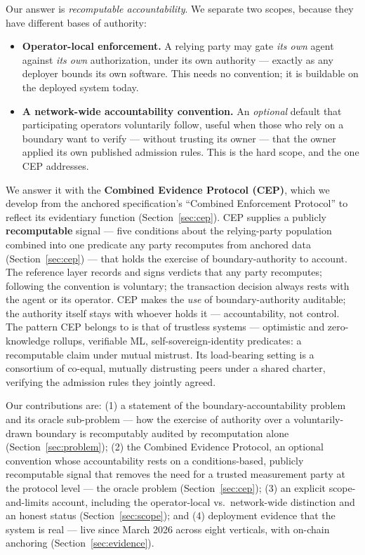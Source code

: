 Our answer is \emph{recomputable accountability}. We separate two scopes, because they have different bases of authority:

\begin{itemize}
  \item \textbf{Operator-local enforcement.} A relying party may gate \emph{its own} agent against \emph{its own} authorization, under its own authority — exactly as any deployer bounds its own software. This needs no convention; it is buildable on the deployed system today.
  \item \textbf{A network-wide accountability convention.} An \emph{optional} default that participating operators voluntarily follow, useful when those who rely on a boundary want to verify — without trusting its owner — that the owner applied its own published admission rules. This is the hard scope, and the one CEP addresses.
\end{itemize}

We answer it with the \textbf{Combined Evidence Protocol (CEP)}, which we develop from the anchored specification's ``Combined Enforcement Protocol'' to reflect its evidentiary function (Section~\ref{sec:cep}). CEP supplies a publicly \textbf{recomputable} signal — five conditions about the relying-party population combined into one predicate any party recomputes from anchored data (Section~\ref{sec:cep}) — that holds the exercise of boundary-authority to account. The reference layer records and signs verdicts that any party recomputes; following the convention is voluntary; the transaction decision always rests with the agent or its operator. CEP makes the \emph{use} of boundary-authority auditable; the authority itself stays with whoever holds it — accountability, not control. The pattern CEP belongs to is that of trustless systems — optimistic and zero-knowledge rollups, verifiable ML, self-sovereign-identity predicates: a recomputable claim under mutual mistrust. Its load-bearing setting is a consortium of co-equal, mutually distrusting peers under a shared charter, verifying the admission rules they jointly agreed.

Our contributions are: (1) a statement of the boundary-accountability problem and its oracle sub-problem — how the exercise of authority over a voluntarily-drawn boundary is recomputably audited by recomputation alone (Section~\ref{sec:problem}); (2) the Combined Evidence Protocol, an optional convention whose accountability rests on a conditions-based, publicly recomputable signal that removes the need for a trusted measurement party at the protocol level — the oracle problem (Section~\ref{sec:cep}); (3) an explicit scope-and-limits account, including the operator-local vs.\ network-wide distinction and an honest status (Section~\ref{sec:scope}); and (4) deployment evidence that the system is real — live since March 2026 across eight verticals, with on-chain anchoring (Section~\ref{sec:evidence}).


